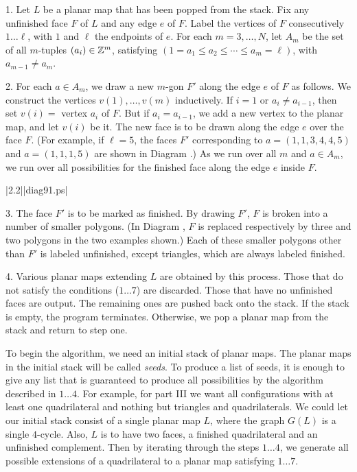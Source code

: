 1.    Let $L$ be a planar
map that has been popped from the stack.  Fix any unfinished face $F$ of $L$
and any edge $e$ of $F$. 
Label the vertices of $F$ consecutively $1\ldots\ell$, with $1$ and
$\ell$ the endpoints of $e$.  For each $m=3,\ldots,N$,
let $A_m$ be the set of all $m$-tuples
$(a_i)\in {\Bbb Z}^m$, 
satisfying $(1=a_1\le a_2\le\cdots\le a_m=\ell)$,
with $a_{m-1}\ne a_m$.  

2.  For each $a\in A_m$, we draw a new $m$-gon $F'$
along the edge $e$ of  $F$ as follows.  
We construct the vertices $v(1),\ldots,v(m)$
inductively.  If $i=1$ or $a_i\ne a_{i-1}$, then set $v(i)=$ vertex $a_i$
of $F$.  But if $a_i=a_{i-1}$, we add a new vertex to the planar map,
and let $v(i)$ be it.  The new face is to be drawn along the edge
$e$ over the face $F$.
(For example, if $\ell = 5$, the faces $F'$ corresponding to
$a = (1,1,3,4,4,5)$ and $a=(1,1,1,5)$ are shown in Diagram .)
As we run over all $m$ and $a\in A_m$, we run over all possibilities
for the finished face along the edge $e$ inside $F$.

\smallskip
\gram|2.2||diag91.ps|
\smallskip

3.  The face $F'$ is to be marked as finished.  By drawing $F'$, $F$
is broken into a number of smaller polygons.  (In Diagram ,
 $F$ is replaced respectively by three and two polygons in the two 
examples shown.)  Each of these smaller polygons other than
$F'$ is labeled unfinished, except triangles,
which are always labeled
finished.

4.  Various planar maps extending $L$ are obtained by this process.
Those that do not satisfy the conditions ($1\ldots7$) are discarded.
Those that have no unfinished faces are output.  The remaining ones
are pushed back onto the stack.  If the stack is empty, the
program terminates.  Otherwise, we pop a planar map from the
stack and return to step one.  


To begin the algorithm, we need an initial stack of planar maps.
The planar maps in the initial stack will be called {\it seeds}.
To produce a list of seeds, it is enough to give any list that is
guaranteed to produce all possibilities by the algorithm described
in $1\ldots4$.  For example, for part III we want all configurations
with at least one quadrilateral and nothing but triangles and quadrilaterals.
We could let our initial stack consist of a single planar map $L$, where
the graph $G(L)$ is a single $4$-cycle.  Also, $L$ is to have two
faces, a finished quadrilateral and an unfinished complement.  Then
by iterating through the steps $1\ldots4$, we generate all possible
extensions of a quadrilateral to a planar map satisfying $1\ldots7$.

